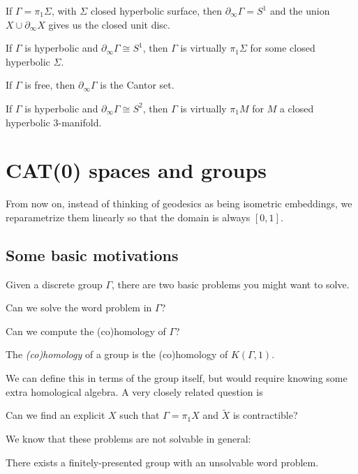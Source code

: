 \documentclass[a4paper]{article}
\begin{document}
\begin{eg}
  If $\Gamma = \pi_1 \Sigma$, with $\Sigma$ closed hyperbolic surface, then $\partial_\infty \Gamma = S^1$ and the union $X \cup \partial_\infty X$ gives us the closed unit disc.
\end{eg}

\begin{thm}
  If $\Gamma$ is hyperbolic and $\partial_\infty \Gamma \cong S^1$, then $\Gamma$ is virtually $\pi_1 \Sigma$ for some closed hyperbolic $\Sigma$.
\end{thm}

\begin{eg}
  If $\Gamma$ is free, then $\partial_\infty \Gamma$ is the Cantor set.
\end{eg}

\begin{conjecture}[Cannon]
  If $\Gamma$ is hyperbolic and $\partial_\infty \Gamma \cong S^2$, then $\Gamma$ is virtually $\pi_1 M$ for $M$ a closed hyperbolic $3$-manifold.
\end{conjecture}

\section{CAT(0) spaces and groups}
From now on, instead of thinking of geodesics as being isometric embeddings, we reparametrize them linearly so that the domain is always $[0, 1]$.

\subsection{Some basic motivations}
Given a discrete group $\Gamma$, there are two basic problems you might want to solve.
\begin{question}
  Can we solve the word problem in $\Gamma$?
\end{question}

\begin{question}
  Can we compute the (co)homology of $\Gamma$?
\end{question}
\begin{defi}
  The \emph{(co)homology} of a group is the (co)homology of $K(\Gamma, 1)$.
\end{defi}
We can define this in terms of the group itself, but would require knowing some extra homological algebra. A very closely related question is
\begin{question}
  Can we find an explicit $X$ such that $\Gamma = \pi_1 X$ and $\tilde{X}$ is contractible?
\end{question}
We know that these problems are not solvable in general:
\begin{thm}
  There exists a finitely-presented group with an unsolvable word problem.
\end{thm}
\end{document}
